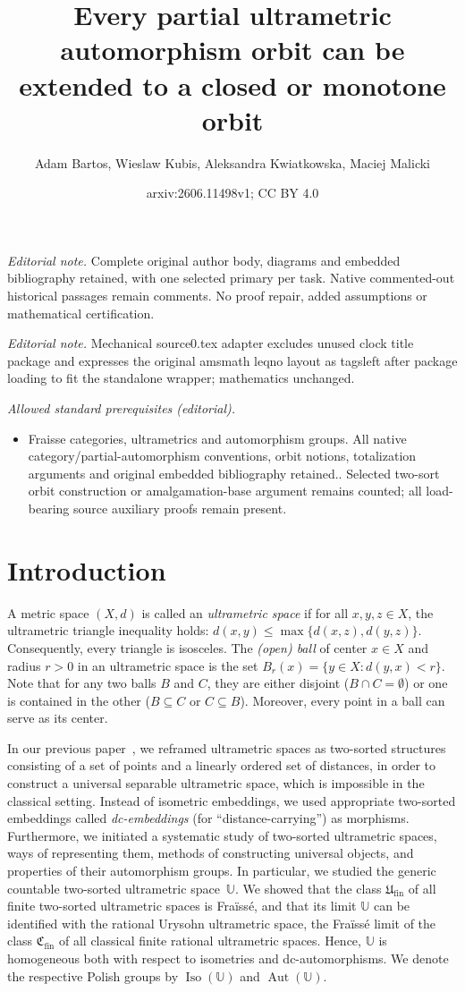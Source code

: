 \documentclass[10pt,a4paper]{article}
\title{Every partial ultrametric automorphism orbit can be extended to a closed or monotone orbit}
\author{Adam Bartos, Wieslaw Kubis, Aleksandra Kwiatkowska, Maciej Malicki}
\date{arxiv:2606.11498v1; CC BY 4.0}
\theoremstyle{definition}
\theoremstyle{remark}
\newcommand \U {\mathbb{U}}
\newcommand \fin {{\operatorname{fin}}}
\newcommand \Ult {\mathfrak{U}}
\newcommand \Aut {\operatorname{Aut}}
\newcommand \Iso {\operatorname{Iso}}
\begin{document}
\maketitle
\noindent\textit{Editorial note.} Complete original author body, diagrams and embedded bibliography retained, with one selected primary per task. Native commented-out historical passages remain comments. No proof repair, added assumptions or mathematical certification.\par\medskip
\noindent\textit{Editorial note.} Mechanical source0.tex adapter excludes unused clock title package and expresses the original amsmath leqno layout as tagsleft after package loading to fit the standalone wrapper; mathematics unchanged.\par\medskip
\noindent\textit{Allowed standard prerequisites (editorial).}\begin{itemize}
\item Fraisse categories, ultrametrics and automorphism groups. All native category/partial-automorphism conventions, orbit notions, totalization arguments and original embedded bibliography retained.. Selected two-sort orbit construction or amalgamation-base argument remains counted; all load-bearing source auxiliary proofs remain present.
\end{itemize}\medskip
\section{Introduction}

A metric space $(X,d)$ is called an {\em ultrametric space} if for all $x,y,z\in X$, the ultrametric triangle inequality holds: $d(x,y)\leq\max\{d(x,z), d(y,z)\}$. 
Consequently, every triangle is isosceles.
The {\em (open) ball} of center $x\in X$ and radius $r>0$ in an ultrametric space is the set $B_r(x)=\{y\in X\colon d(y,x)<r\}$.
Note that for any two balls $B$ and $C$, they are either disjoint ($B\cap C=\emptyset$) or one is contained in the other ($B\subseteq C$ or $C\subseteq B$). Moreover, every point in a ball can serve as its center.

In our previous paper~\cite{paper1}, we reframed ultrametric spaces as two-sorted structures consisting of a set of points and a linearly ordered set of distances, in order to construct a universal separable ultrametric space, which is impossible in the classical setting.
Instead of isometric embeddings, we used appropriate two-sorted embeddings called \emph{dc-embeddings} (for “distance-carrying”) as morphisms.
Furthermore, we initiated a systematic study of two-sorted ultrametric spaces, ways of representing them, methods of constructing universal objects, and properties of their automorphism groups.
In particular, we studied the generic countable two-sorted ultrametric space~$\U$.
We showed that the class $\Ult_\fin$ of all finite two-sorted ultrametric spaces is Fraïssé, and that its limit $\U$ can be identified with the rational Urysohn ultrametric space, the Fraïssé limit of the class $\mathfrak{C}_\fin$ of all classical finite rational ultrametric spaces.
Hence, $\U$ is homogeneous both with respect to isometries and dc-automorphisms.
We denote the respective Polish groups by $\Iso(\U)$ and $\Aut(\U)$.
\end{document}
